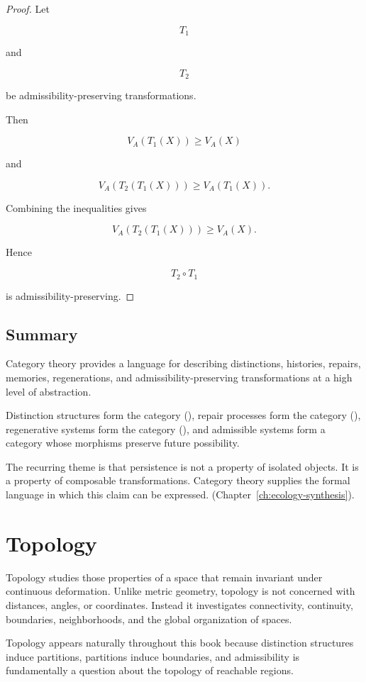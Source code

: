\documentclass[12pt,twoside,openright]{book}
\begin{document}
\begin{proof}
Let

\[
T_1
\]

and

\[
T_2
\]

be admissibility-preserving transformations.

Then

\[
V_A(T_1(X))
\ge
V_A(X)
\]

and

\[
V_A(T_2(T_1(X)))
\ge
V_A(T_1(X)).
\]

Combining the inequalities gives

\[
V_A(T_2(T_1(X)))
\ge
V_A(X).
\]

Hence

\[
T_2\circ T_1
\]

is admissibility-preserving.
\end{proof}

\subsection{Summary}

Category theory provides a language for describing
distinctions, histories, repairs, memories,
regenerations, and admissibility-preserving
transformations at a high level of abstraction.

Distinction structures form the category
(), repair processes form the category
(), regenerative systems form the category
(), and admissible systems form a category
whose morphisms preserve future possibility.

The recurring theme is that persistence is not a property
of isolated objects. It is a property of composable
transformations. Category theory supplies the formal
language in which this claim can be expressed.
(Chapter~\ref{ch:ecology-synthesis}).

\section{Topology}

Topology studies those properties of a space that remain
invariant under continuous deformation. Unlike metric
geometry, topology is not concerned with distances,
angles, or coordinates. Instead it investigates
connectivity, continuity, boundaries, neighborhoods, and
the global organization of spaces.

Topology appears naturally throughout this book because
distinction structures induce partitions, partitions
induce boundaries, and admissibility is fundamentally a
question about the topology of reachable regions.
\end{document}
